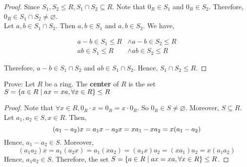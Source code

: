 \begin{proof}
    Since $S_1, S_2 \leq R, S_1 \cap S_2 \subseteq R$. Note that $0_R \in S_1$ and $0_R \in S_2$. Therefore, $0_R \in S_1 \cap S_2 \neq \varnothing$. \\
    
    Let $a, b \in S_1 \cap S_2$. Then $a, b \in S_1$ and $a, b \in S_2$. We have,
    
    \begin{align*}
        a - b \in S_1 \leq R &\land a - b \in S_2 \leq R \\
        ab \in S_1 \leq R &\land ab \in S_2 \leq R
    \end{align*}
    
    Therefore, $a - b \in S_1 \cap S_2$ and $ab \in S_1 \cap S_2$. Hence, $S_1 \cap S_2 \leq R$. \qedsymbol
\end{proof}

\begin{exercise}
    Prove: Let $R$ be a ring. The \textbf{center} of $R$ is the set $S = \qty{a \in R \mid ax = xa, \forall x \in R} \leq R$
\end{exercise}

\begin{proof}
    Note that $\forall x \in R, 0_R \cdot x = 0_R = x \cdot 0_R$. So $0_R \in S \neq \varnothing$. Moreover, $S \subseteq R$. \\
    
    Let $a_1, a_2 \in S, x \in R$. Then, \[ \qty(a_1 - a_2)x = a_1 x - a_2 x = x a_1 - x a_2 = x(a_1 - a_2) \]
    Hence, $a_1 - a_2 \in S$. Moreover, 
    \[ (a_1a_2)x = a_1(a_2x) = a_1(xa_2) = (a_1x)a_2 = (xa_1)a_2 = x(a_1a_2)  \]
    Hence, $a_1a_2 \in S$. Therefore, the set $S = \qty{a \in R \mid ax = xa, \forall x \in R} \leq R$. \qedsymbol
\end{proof}